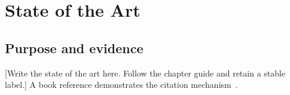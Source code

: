 \chapter{State of the Art}
\label{chap:state_of_the_art}
\section{Purpose and evidence}
[Write the state of the art here. Follow the chapter guide and retain a stable label.]
A book reference demonstrates the citation mechanism~\cite{knuth1984}.
